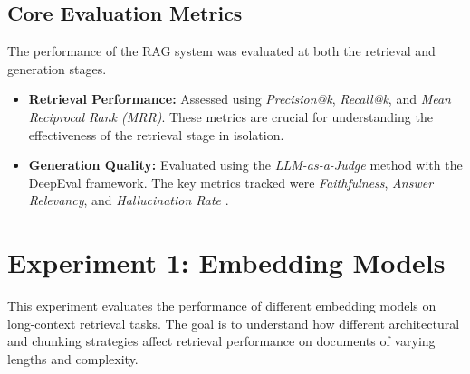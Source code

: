 \subsection{Core Evaluation Metrics}
The performance of the RAG system was evaluated at both the retrieval and generation stages.
\begin{itemize}
\item \textbf{Retrieval Performance:} Assessed using \textit{Precision@k}, \textit{Recall@k}, and \textit{Mean Reciprocal Rank (MRR)}. These metrics are crucial for understanding the effectiveness of the retrieval stage in isolation.
\item \textbf{Generation Quality:} Evaluated using the \textit{LLM-as-a-Judge} method with the DeepEval framework. The key metrics tracked were \textit{Faithfulness}, \textit{Answer Relevancy}, and \textit{Hallucination Rate} \autocite{zheng2023judging}.
\end{itemize}

\section{Experiment 1: Embedding Models}
\label{sec:exp_embedding_models}
This experiment evaluates the performance of different embedding models on long-context retrieval tasks. The goal is to understand how different architectural and chunking strategies affect retrieval performance on documents of varying lengths and complexity.

